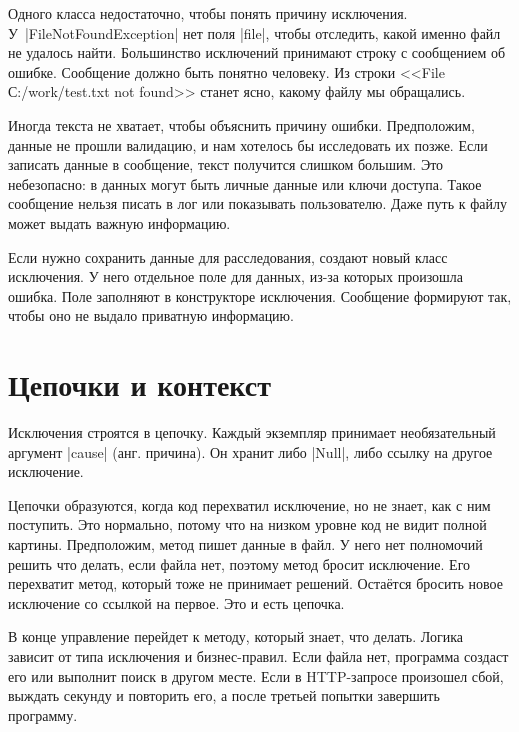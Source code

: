 Одного класса недостаточно, чтобы понять причину
исключения. У~\spverb|FileNotFoundException| нет поля \spverb|file|, чтобы
отследить, какой именно файл не удалось найти. Большинство исключений принимают
строку с сообщением об ошибке. Сообщение должно быть понятно человеку. Из строки
<<File С:/work/test.txt not found>> станет ясно, какому файлу мы обращались.


Иногда текста не хватает, чтобы объяснить причину ошибки. Предположим, данные не
прошли валидацию, и нам хотелось бы исследовать их позже. Если записать данные в
сообщение, текст получится слишком большим. Это небезопасно: в данных могут быть
личные данные или ключи доступа. Такое сообщение нельзя писать в лог или
показывать пользователю. Даже путь к файлу может выдать важную информацию.

Если нужно сохранить данные для расследования, создают новый класс исключения. У
него отдельное поле для данных, из-за которых произошла ошибка. Поле заполняют в
конструкторе исключения. Сообщение формируют так, чтобы оно не выдало приватную
информацию.

\section{Цепочки и контекст}


Исключения строятся в цепочку. Каждый экземпляр принимает необязательный
аргумент \spverb|cause| (анг. причина). Он хранит либо \spverb|Null|, либо
ссылку на другое исключение.



Цепочки образуются, когда код перехватил исключение, но не знает, как с ним
поступить.  Это нормально, потому что на низком уровне код не видит полной
картины. Предположим, метод пишет данные в файл. У него нет полномочий решить
что делать, если файла нет, поэтому метод бросит исключение. Его перехватит
метод, который тоже не принимает решений. Оста\"{е}тся бросить новое исключение
со ссылкой на первое. Это и есть цепочка.

В конце управление перейдет к методу, который знает, что делать. Логика зависит
от типа исключения и бизнес-правил. Если файла нет, программа создаст его или
выполнит поиск в другом месте. Если в HTTP-запросе произошел сбой, выждать
секунду и повторить его, а после третьей попытки завершить программу.

